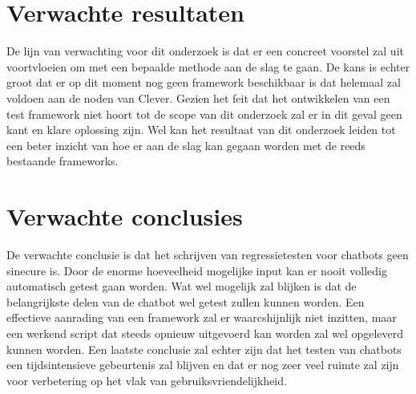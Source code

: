 \section{Verwachte resultaten}
\label{sec:verwachte_resultaten}

De lijn van verwachting voor dit onderzoek is dat er een concreet voorstel zal uit voortvloeien om met een bepaalde methode aan de slag te gaan. De kans is echter groot dat er op dit moment nog geen framework beschikbaar is dat helemaal zal voldoen aan de noden van Clever. Gezien het feit dat het ontwikkelen van een test framework niet hoort tot de scope van dit onderzoek zal er in dit geval geen kant en klare oplossing zijn. Wel kan het resultaat van dit onderzoek leiden tot een beter inzicht van hoe er aan de slag kan gegaan worden met de reeds bestaande frameworks.

\section{Verwachte conclusies}
\label{sec:verwachte_conclusies}

De verwachte conclusie is dat het schrijven van regressietesten voor chatbots geen sinecure is. Door de enorme hoeveelheid mogelijke input kan er nooit volledig automatisch getest gaan worden. Wat wel mogelijk zal blijken is dat de belangrijkste delen van de chatbot wel getest zullen kunnen worden. Een effectieve aanrading van een framework zal er waarcshijnlijk niet inzitten, maar een werkend script dat steeds opnieuw uitgevoerd kan worden zal wel opgeleverd kunnen worden. Een laatste conclusie zal echter zijn dat het testen van chatbots een tijdsintensieve gebeurtenis zal blijven en dat er nog zeer veel ruimte zal zijn voor verbetering op het vlak van gebruiksvriendelijkheid.

